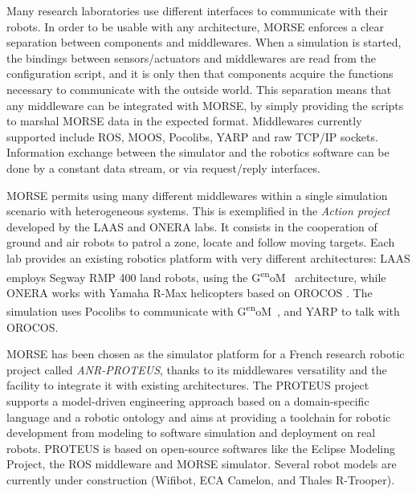 \documentclass{llncs}
\def\genom{G\textsuperscript{en}oM~}
\newcommand{\gilberto}[1]{\nb{Gilberto}{red}{#1}}
\begin{document}
Many research laboratories use different interfaces to communicate with their
robots. In order to be usable with any architecture, MORSE enforces a
clear separation between components and middlewares. When a simulation is started,
the bindings between sensors/actuators and middlewares are read from the
configuration script, and it is only then that components acquire the functions
necessary to communicate with the outside world.
This separation means that any middleware can be integrated with MORSE, by
simply providing the scripts to marshal MORSE data in the expected format.
Middlewares currently supported include ROS, MOOS, Pocolibs, YARP and
raw TCP/IP sockets.
Information exchange between the simulator and the robotics software can be
done by a constant data stream, or via request/reply interfaces.

MORSE permits using many different middlewares within a single simulation
scenario with heterogeneous systems. This is exemplified in the \emph{Action
project} \cite{6106782} developed by the LAAS and ONERA labs.
It consists in the cooperation of ground and air robots to patrol a zone,
locate and follow moving targets.
Each lab provides an existing robotics platform with very different
architectures: LAAS employs Segway RMP 400 land robots, using the \genom
\cite{MALLET-2011-599677} architecture, while ONERA works with Yamaha R-Max
helicopters based on OROCOS \cite{orocos2003}. The simulation uses Pocolibs to
communicate with \genom, and YARP to talk with OROCOS.


MORSE has been chosen as the simulator platform for a French research
robotic project called \emph{ANR-PROTEUS}, thanks to
its middlewares versatility and the facility to integrate it with
existing architectures.
The PROTEUS project supports a model-driven engineering approach based on a
domain-specific language and a robotic ontology \cite{Dhouib:2011zr} and aims at
providing a toolchain for robotic development from modeling to software
simulation and deployment on real robots. PROTEUS is based on open-source
softwares like the Eclipse Modeling Project, the ROS middleware and MORSE
simulator. Several robot models are currently under construction (Wifibot,
ECA Camelon, and Thales R-Trooper).
\end{document}
